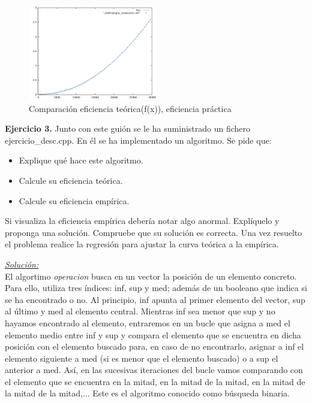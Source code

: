 \documentclass[titlepage, 12pt,a4paper]{article}
\begin{document}
\begin{figure}[!ht]
  \caption{Comparación eficiencia teórica(f(x)), eficiencia práctica}
  \centering
    \includegraphics[width=0.5\textwidth]{./img/ef_pract_ej_2.png}
\end{figure}
\newpage
\textbf{\large Ejercicio 3.} Junto con este guión se le ha suministrado un fichero ejercicio\_desc.cpp. En él se ha implementado un algoritmo. Se pide que:\\ 
	\begin{itemize}  
	\item  Explique qué hace este algoritmo.
	\item  Calcule su eficiencia teórica. 
	\item Calcule su eficiencia empírica.
	\end{itemize}
Si visualiza la eficiencia empírica debería notar algo anormal. Explíquelo y proponga una solución. Compruebe que su solución es correcta. Una vez resuelto el problema realice la regresión para ajustar la curva teórica a la empírica.
\vspace {1em}	

\underline{\emph{Solución:}}\\
El algortimo \textit{operacion} busca en un vector la posición de un elemento concreto. Para ello, utiliza tres índices: inf, sup y med; además de un booleano que indica si se ha encontrado o no. Al principio, inf apunta al primer elemento del vector, sup al último y med al elemento central. Mientras inf sea menor que sup y no hayamos encontrado al elemento, entraremos en un bucle que asigna a med el elemento medio entre inf y sup y compara el elemento que se encuentra en dicha posición con el elemento buscado para, en caso de no encontrarlo, asignar a inf el elemento siguiente a med (si es menor que el elemento buscado) o a sup el anterior a med. Así, en las sucesivas iteraciones del bucle vamos comparando con el elemento que se encuentra en la mitad, en la mitad de la mitad, en la mitad de la mitad de la mitad,... Este es el algoritmo conocido como búsqueda binaria.\vspace{1em}
\end{document}
